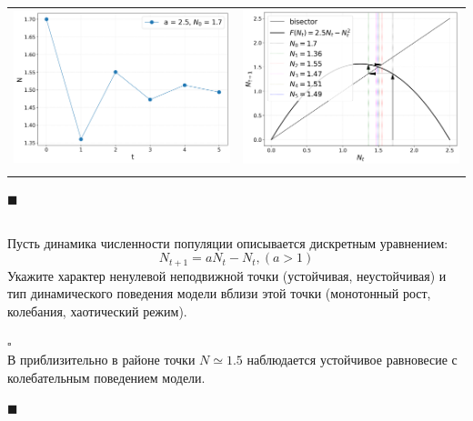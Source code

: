 \documentclass[a4paper]{article}
\newcommand{\solutionstart}{{\noindent $\square$ \\}}
\newcommand{\solutionend}{{\noindent $\blacksquare$ \\}}
\begin{document}
\begin{tabular}{p{8cm}p{8cm}}
\includegraphics[width=\linewidth]{N(t).png} &
\includegraphics[width=\linewidth]{stairs.png} \\
\centering{Временная динамика} & \centering{Лестница Ламерея}
\end{tabular}

\solutionend

\subsection{}
Пусть динамика численности популяции описывается дискретным уравнением:
\[
N_{t + 1} = a N_t - N_t, (a > 1)
\]
Укажите характер ненулевой неподвижной точки (устойчивая, неустойчивая) и тип динамического поведения модели вблизи этой точки (монотонный рост, колебания, хаотический режим).


\solutionstart
В приблизительно в районе точки $N \simeq 1.5$ наблюдается устойчивое равновесие с колебательным поведением модели.

\solutionend
\end{document}
